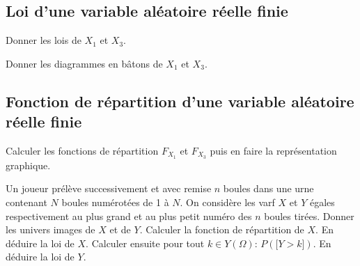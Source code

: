 \documentclass[a4paper, 11pt]{article}
\begin{document}
\subsection{Loi d'une variable al\'eatoire r\'eelle finie}



\begin{exemple}  
Donner les lois de $X_1$ et $X_3$.
\end{exemple} 

\vspace{8cm}
 



\begin{exemple}  
Donner les diagrammes en bâtons de $X_1$ et $X_3$.
\end{exemple} 
\vspace{4cm}

\subsection{Fonction de r\'epartition d'une variable al\'eatoire r\'eelle finie}


 




\begin{exemple} 
Calculer les fonctions de r\'epartition $F_{X_1}$ et $F_{X_3}$ puis en faire  la repr\'esentation graphique.
\end{exemple} 


\vspace{10cm}






\begin{exercice} Un joueur pr\'el\`eve successivement et avec remise $n$ boules dans une urne contenant $N$ boules num\'erot\'ees de 1 \`a $N$. On consid\`ere les varf $X$ et $Y$ \'egales respectivement au plus grand et au plus petit num\'ero des $n$ boules tir\'ees. Donner les univers images de $X$ et de $Y$. Calculer la fonction de r\'epartition de $X$. En d\'eduire la loi de $X$. Calculer ensuite pour tout $k\in Y(\Omega)$: $P(\lbrack Y>k\rbrack)$. En d\'eduire la loi de $Y$.
\end{exercice}
\end{document}
